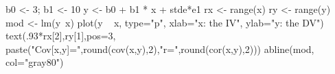 \begin{Schunk}
\begin{Sinput}
 b0 <- 3; b1 <- 10
 y <- b0 + b1 * x + stde*e1
 rx <- range(x)
 ry <- range(y)
 mod <- lm(y~x)
 plot(y ~ x, type="p", xlab="x: the IV", ylab="y: the DV")
 text(.93*rx[2],ry[1],pos=3, paste("Cov[x,y]=",round(cov(x,y),2),"\n r=",round(cor(x,y),2)))
 abline(mod, col="gray80")
\end{Sinput}
\end{Schunk}
